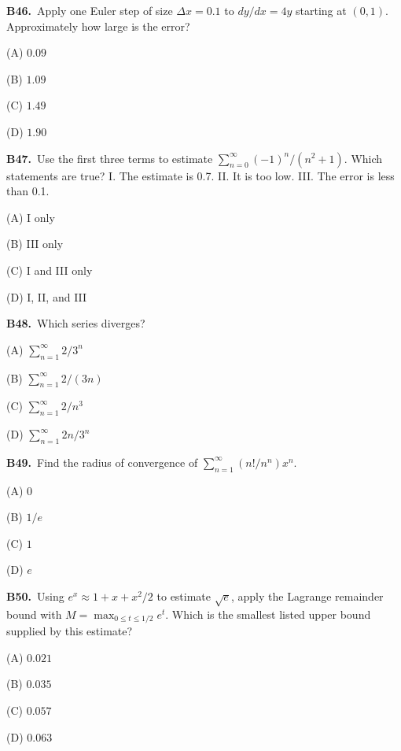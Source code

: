 \documentclass[11pt]{article}
\begin{document}
\bigskip\noindent\textbf{B46.}\ Apply one Euler step of size $\Delta x=0.1$ to $dy/dx=4y$ starting at $(0,1)$. Approximately how large is the error?
\begin{list}{}{\setlength{\leftmargin}{3em}\setlength{\labelwidth}{2.5em}\setlength{\itemsep}{0pt}\setlength{\topsep}{2pt}}
\item[(A)] $0.09$
\item[(B)] $1.09$
\item[(C)] $1.49$
\item[(D)] $1.90$
\end{list}

\bigskip\noindent\textbf{B47.}\ Use the first three terms to estimate $\sum_{n=0}^{\infty}(-1)^n/(n^2+1)$. Which statements are true? I. The estimate is 0.7. II. It is too low. III. The error is less than 0.1.
\begin{list}{}{\setlength{\leftmargin}{3em}\setlength{\labelwidth}{2.5em}\setlength{\itemsep}{0pt}\setlength{\topsep}{2pt}}
\item[(A)] I only
\item[(B)] III only
\item[(C)] I and III only
\item[(D)] I, II, and III
\end{list}

\bigskip\noindent\textbf{B48.}\ Which series diverges?
\begin{list}{}{\setlength{\leftmargin}{3em}\setlength{\labelwidth}{2.5em}\setlength{\itemsep}{0pt}\setlength{\topsep}{2pt}}
\item[(A)] $\sum_{n=1}^{\infty}2/3^n$
\item[(B)] $\sum_{n=1}^{\infty}2/(3n)$
\item[(C)] $\sum_{n=1}^{\infty}2/n^3$
\item[(D)] $\sum_{n=1}^{\infty}2n/3^n$
\end{list}

\bigskip\noindent\textbf{B49.}\ Find the radius of convergence of $\sum_{n=1}^{\infty}(n!/n^n)x^n$.
\begin{list}{}{\setlength{\leftmargin}{3em}\setlength{\labelwidth}{2.5em}\setlength{\itemsep}{0pt}\setlength{\topsep}{2pt}}
\item[(A)] $0$
\item[(B)] $1/e$
\item[(C)] $1$
\item[(D)] $e$
\end{list}

\bigskip\noindent\textbf{B50.}\ Using $e^x\approx1+x+x^2/2$ to estimate $\sqrt e$, apply the Lagrange remainder bound with $M=\max_{0\le t\le1/2}e^t$. Which is the smallest listed upper bound supplied by this estimate?
\begin{list}{}{\setlength{\leftmargin}{3em}\setlength{\labelwidth}{2.5em}\setlength{\itemsep}{0pt}\setlength{\topsep}{2pt}}
\item[(A)] $0.021$
\item[(B)] $0.035$
\item[(C)] $0.057$
\item[(D)] $0.063$
\end{list}
\end{document}
